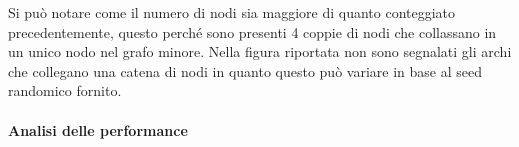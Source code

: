 \documentclass[12pt]{article}
\begin{document}
Si può notare come il numero di nodi sia maggiore di quanto conteggiato precedentemente, questo perché sono presenti 4 coppie di nodi che collassano in un unico nodo nel grafo minore.
Nella figura riportata non sono segnalati gli archi che collegano una catena di nodi in quanto questo può variare in base al seed randomico fornito.

\paragraph{Analisi delle performance}
\end{document}
